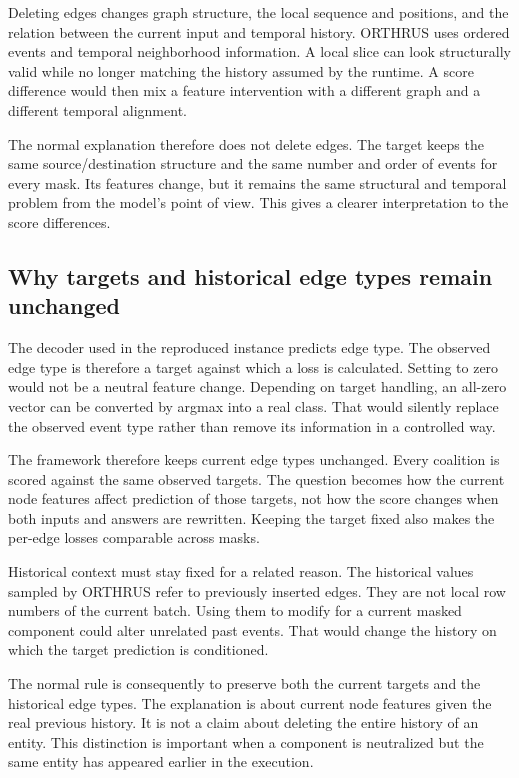 \documentclass[11pt,a4paper]{article}
\newcommand{\code}[1]{\texttt{\detokenize{#1}}}
\begin{document}
Deleting edges changes graph structure, the local sequence and positions, and
the relation between the current input and temporal history. ORTHRUS uses
ordered events and temporal neighborhood information. A local slice can look
structurally valid while no longer matching the history assumed by the runtime.
A score difference would then mix a feature intervention with a different graph
and a different temporal alignment.

The normal explanation therefore does not delete edges. The target keeps the
same source/destination structure and the same number and order of events for
every mask. Its features change, but it remains the same structural and temporal
problem from the model's point of view. This gives a clearer interpretation to
the score differences.

\subsection{Why targets and historical edge types remain unchanged}
The decoder used in the reproduced instance predicts edge type. The observed
edge type is therefore a target against which a loss is calculated. Setting
\code{batch.edge_type} to zero would not be a neutral feature change. Depending
on target handling, an all-zero vector can be converted by argmax into a real
class. That would silently replace the observed event type rather than remove
its information in a controlled way.

The framework therefore keeps current edge types unchanged. Every coalition is scored
against the same observed targets. The question becomes how the current node
features affect prediction of those targets, not how the score changes when
both inputs and answers are rewritten. Keeping the target fixed also makes
the per-edge losses comparable across masks.

Historical context must stay fixed for a related reason. The historical
\code{e_id} values sampled by ORTHRUS refer to previously inserted edges.
They are not local row numbers of the current batch. Using them to modify
\code{full_data.edge_type} for a current masked component could alter unrelated
past events. That would change the history on which the target prediction is
conditioned.

The normal rule is consequently to preserve both the current targets and the
historical edge types. The explanation is about current node features given
the real previous history. It is not a claim about deleting the entire history
of an entity. This distinction is important when a component is neutralized
but the same entity has appeared earlier in the execution.
\end{document}

